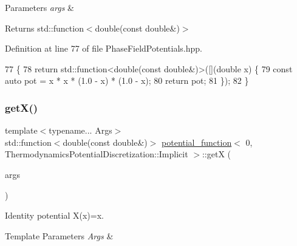 \begin{DoxyParams}{Parameters}
{\em args} & \\
\hline
\end{DoxyParams}
\begin{DoxyReturn}{Returns}
std\+::function$<$double(const double\&)$>$ 
\end{DoxyReturn}


Definition at line 77 of file Phase\+Field\+Potentials.\+hpp.


\begin{DoxyCode}
77                                                         \{
78     \textcolor{keywordflow}{return} std::function<double(const double&)>([](\textcolor{keywordtype}{double} x) \{
79       \textcolor{keyword}{const} \textcolor{keyword}{auto} pot = x * x * (1.0 - x) * (1.0 - x);
80       \textcolor{keywordflow}{return} pot;
81     \});
82   \}
\end{DoxyCode}
\mbox{\label{structpotential__function_3_010_00_01ThermodynamicsPotentialDiscretization_1_1Implicit_01_4_ac1e8415ca039946ab75d5da92b956d7f}} 
\subsubsection{\texorpdfstring{get\+X()}{getX()}}
{\footnotesize\ttfamily template$<$typename... Args$>$ \\
std\+::function$<$double(const double\&)$>$ \hyperlink{structpotential__function}{potential\+\_\+function}$<$ 0, Thermodynamics\+Potential\+Discretization\+::\+Implicit $>$\+::getX (\begin{DoxyParamCaption}\item[{Args...}]{args }\end{DoxyParamCaption})\hspace{0.3cm}{\ttfamily [inline]}}



Identity potential X(x)=x. 


\begin{DoxyTemplParams}{Template Parameters}
{\em Args} & \\
\hline
\end{DoxyTemplParams}

